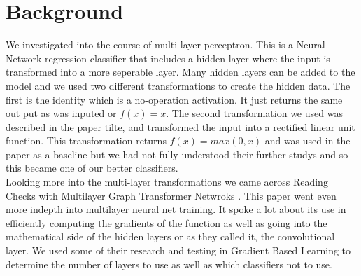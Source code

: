 
\section{Background}
\label{sec:background}

We investigated into the course of multi-layer perceptron. This is a
Neural Network regression classifier that includes a hidden layer
where the input is transformed into a more seperable layer. Many
hidden layers can be added to the model and we used two different
transformations to create the hidden data. The first is the identity
which is a no-operation activation. It just returns the same out put
as was inputed or $f(x)=x$. The second transformation we used was
described in the paper tilte,
and transformed the input into a rectified linear unit function.\cite{milgram} This
transformation returns $f(x)=max(0,x)$ and was used in the paper as a
baseline but we had not fully understood their further studys and so
this became one of our better classifiers. \\

Looking more into the multi-layer transformations we came across
Reading Checks with Multilayer Graph Transformer Netwroks
\cite{cun}. This paper went even more indepth into multilayer neural
net training. It spoke a lot about its use in efficiently computing
the gradients of the function as well as going into the mathematical
side of the hidden layers or as they called it, the convolutional
layer. We used some of their research and testing in Gradient Based
Learning to determine the number of layers to use as well as which
classifiers not to use. \\




